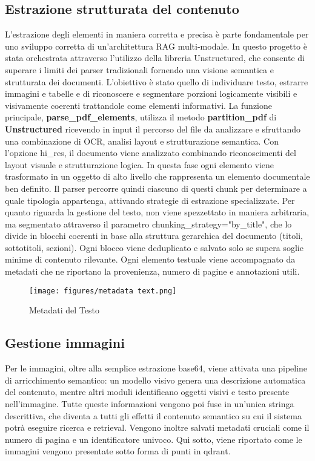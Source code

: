 \subsection{Estrazione strutturata del contenuto}
L'estrazione degli elementi in maniera corretta e precisa è parte fondamentale per uno sviluppo corretta di un'architettura RAG multi-modale. In questo progetto è stata orchestrata attraverso l'utilizzo della libreria Unstructured, che consente di superare i limiti dei parser tradizionali fornendo una visione semantica e strutturata dei documenti. L'obiettivo è stato quello di individuare testo, estrarre immagini e tabelle e di riconoscere e segmentare porzioni logicamente visibili e visivamente coerenti trattandole come elementi informativi. 
La funzione principale, \textbf{parse\_pdf\_elements}, utilizza il metodo \textbf{partition\_pdf} di \textbf{Unstructured} ricevendo in input il percorso del file da analizzare e sfruttando una combinazione di OCR, analisi layout e strutturazione semantica. Con l'opzione hi\_res, il documento viene analizzato combinando riconoscimenti del layout visuale e strutturazione logica. In questa fase ogni elemento viene trasformato in un oggetto di alto livello che rappresenta un elemento documentale ben definito. Il parser percorre quindi ciascuno di questi chunk per determinare a quale tipologia appartenga, attivando strategie di estrazione specializzate. Per quanto riguarda la gestione del testo, non viene spezzettato in maniera arbitraria, ma segmentato  attraverso il parametro chunking\_strategy="by\_title", che lo divide in blocchi coerenti in base alla struttura gerarchica del documento (titoli, sottotitoli, sezioni). Ogni blocco viene deduplicato e salvato solo se supera soglie minime di contenuto rilevante. Ogni elemento testuale viene accompagnato da metadati che ne riportano la provenienza, numero di pagine e annotazioni utili. 
\begin{figure}[!ht]
\centering
\texttt{[image: figures/metadata text.png]}
\caption{Metadati del Testo}
\end{figure}

\subsection{Gestione immagini}

Per le immagini, oltre alla semplice estrazione base64, viene attivata una pipeline di arricchimento semantico: un modello visivo genera una descrizione automatica del contenuto, mentre altri moduli identificano oggetti visivi e testo presente nell'immagine. Tutte queste informazioni vengono poi fuse in un'unica stringa descrittiva, che diventa a tutti gli effetti il contenuto semantico su cui il sistema potrà eseguire ricerca e retrieval. Vengono inoltre salvati metadati cruciali come il numero di pagina e un identificatore univoco. Qui sotto, viene riportato come le immagini vengono presentate sotto forma di punti in qdrant. 


